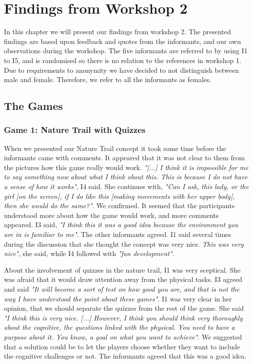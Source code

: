 \chapter{Findings from Workshop 2}

In this chapter we will present our findings from workshop 2. The presented findings are based upon feedback and quotes from the informants, and our own observations during the workshop. The five informants are referred to by using I1 to I5, and is randomised so there is no relation to the references in workshop 1. Due to requirements to anonymity we have decided to not distinguish between male and female. Therefore, we refer to all the informants as females. 

\section{The Games}

\subsection{Game 1: Nature Trail with Quizzes}

When we presented our Nature Trail concept it took some time before the informants came with comments. It appeared that it was not clear to them from the pictures how this game really would work. \emph{"[...] I think it is impossible for me to say something now about what I think about this. This is because I do not have a sense of how it works"}, I4 said. She continues with, \emph{"Can I ask, this lady, or the girl [on the screen], if I do like this [making movements with her upper body], then she would do the same?"}. We confirmed. It seemed that the participants understood more about how the game would work, and more comments appeared. I3 said, \emph{"I think this it was a good idea because the environment you are in is familiar to me"}. The other informants agreed. I1 said several times during the discussion that she thought the concept was very nice. \emph{This was very nice"}, she said, while I4 followed with \emph{"fun development"}.  

About the involvement of quizzes in the nature trail, I1 was very sceptical. She was afraid that it would draw attention away from the physical tasks. I3 agreed and said \emph{"It will become a sort of test on how good you are, and that is not the way I have understood the point about these games"}. I1 was very clear in her opinion, that we should separate the quizzes from the rest of the game. She said \emph{"I think this is very nice. [...] However, I think you should think very thoroughly about the cognitive, the questions linked with the physical. You need to have a purpose about it. You know, a goal on what you want to achieve"}. We suggested that a solution could be to let the players choose whether they want to include the cognitive challenges or not. The informants agreed that this was a good idea.


